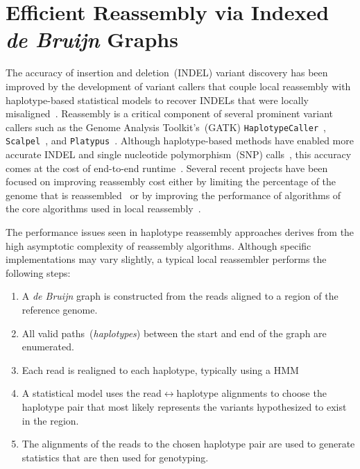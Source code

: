 \documentclass[masters]{ucbthesis}
\begin{document}
\section{Efficient Reassembly via Indexed \emph{de Bruijn} Graphs}
\label{sec:reference-threaded}

The accuracy of insertion and deletion~(INDEL) variant discovery has been improved by the development
of variant callers that couple local reassembly with haplotype-based statistical models to recover INDELs
that were locally misaligned~\cite{albers11}. Reassembly is a critical component of several prominent variant
callers such as the Genome
Analysis Toolkit's~(GATK) \texttt{HaplotypeCaller}~\cite{depristo11}, \texttt{Scalpel}~\cite{narzisi14}, and
\texttt{Platypus}~\cite{rimmer14}. Although haplotype-based methods have enabled more accurate INDEL
and single nucleotide polymorphism~(SNP) calls~\cite{bao14}, this accuracy comes at the cost of
end-to-end runtime~\cite{talwalkar14}. Several recent projects have been focused on improving
reassembly cost either by limiting the percentage of the genome that is reassembled~\cite{bloniarz14} or
by improving the performance of algorithms of the core algorithms used in local
reassembly~\cite{rimmer14}.

The performance issues seen in haplotype reassembly approaches derives from the high asymptotic
complexity of reassembly algorithms. Although specific implementations may vary slightly, a typical
local reassembler performs the following steps:

\begin{enumerate}
\item A \emph{de Bruijn} graph is constructed from the reads aligned to a region of the reference genome.
\item All valid paths~(\emph{haplotypes}) between the start and end of the graph are enumerated.
\item Each read is realigned to each haplotype, typically using a HMM
\item A statistical model uses the read$\leftrightarrow$haplotype alignments to choose the haplotype pair
that most likely represents the variants hypothesized to exist in the region.
\item The alignments of the reads to the chosen haplotype pair are used to generate statistics that are
then used for genotyping.
\end{enumerate}
\end{document}
